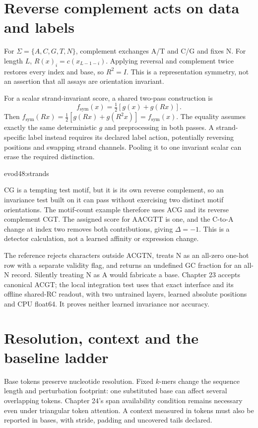 \section{Reverse complement acts on data and labels}
For $\Sigma=\{A,C,G,T,N\}$, complement exchanges A/T and C/G and fixes N.
For length $L$, $R(x)_i=c(x_{L-1-i})$. Applying reversal and complement twice
restores every index and base, so $R^2=I$. This is a representation symmetry,
not an assertion that all assays are orientation invariant.

For a scalar strand-invariant score, a shared two-pass construction is
\[
f_{\mathrm{sym}}(x)=\tfrac12[g(x)+g(Rx)].
\]
Then $f_{\mathrm{sym}}(Rx)=\tfrac12[g(Rx)+g(R^2x)]=f_{\mathrm{sym}}(x)$.
The equality assumes exactly the same deterministic $g$ and preprocessing in
both passes. A strand-specific label instead requires its declared label
action, potentially reversing positions and swapping strand channels. Pooling
it to one invariant scalar can erase the required distinction.

{evod48:strands}

CG is a tempting test motif, but it is its own reverse complement, so an
invariance test built on it can pass without exercising two distinct motif
orientations. The motif-count example therefore uses ACG and its reverse
complement CGT. The assigned score for AACGTT is one, and the C-to-A
change at index two removes both contributions, giving $\Delta=-1$.
This is a detector calculation, not a learned affinity or expression change.

The reference rejects characters outside ACGTN, treats N as an all-zero
one-hot row with a separate validity flag, and returns an undefined GC fraction
for an all-N record. Silently treating N as A would fabricate a base. Chapter
23 accepts canonical ACGT; the local integration test uses that exact interface
and its offline shared-RC readout, with two untrained layers, learned absolute
positions and CPU float64. It proves neither learned invariance nor accuracy.

\section{Resolution, context and the baseline ladder}
Base tokens preserve nucleotide resolution. Fixed $k$-mers change the sequence
length and perturbation footprint: one substituted base can affect several
overlapping tokens. Chapter 24's span availability condition remains necessary
even under triangular token attention. A context measured in tokens must also
be reported in bases, with stride, padding and uncovered tails declared.

